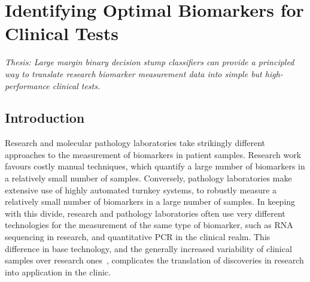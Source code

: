 \documentclass[dissertation.tex]{subfiles}
\begin{document}
\chapter[Identifying Optimal Biomarkers for Clinical Tests][Finding Optimal Biomarkers]{Identifying Optimal Biomarkers for Clinical Tests}
\label{chap:messina}


\emph{Thesis: Large margin binary decision stump classifiers can provide a principled way to translate research biomarker measurement data into simple but high-performance clinical tests.}


%


\section{Introduction}

Research and molecular pathology laboratories take strikingly different approaches to the measurement of biomarkers in patient samples.  Research work favours costly manual techniques, which quantify a large number of biomarkers in a relatively small number of samples.  Conversely, pathology laboratories make extensive use of highly automated turnkey systems, to robustly measure a relatively small number of biomarkers in a large number of samples.  In keeping with this divide, research and pathology laboratories often use very different technologies for the measurement of the same type of biomarker, such as RNA sequencing in research, and quantitative PCR in the clinical realm.  This difference in base technology, and the generally increased variability of clinical samples over research ones~\cite{Hewitt2008}, complicates the translation of discoveries in research into application in the clinic.
\end{document}
